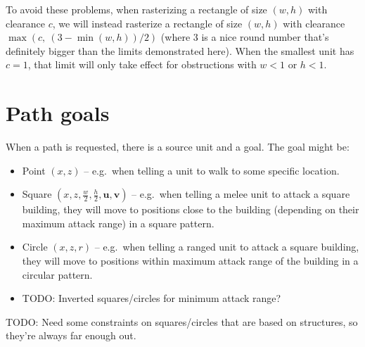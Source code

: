 \documentclass[a4paper,10pt]{article}
\begin{document}

To avoid these problems,
when rasterizing a rectangle of size $(w,h)$ with clearance $c$,
we will instead rasterize a rectangle of size $(w,h)$ with clearance $\max(c,\ (3-\min(w,h))/2)$
(where 3 is a nice round number that's definitely bigger than the limits demonstrated here).
When the smallest unit has $c=1$,
that limit will only take effect for obstructions with $w < 1$ or $h < 1$.

\section{Path goals}

When a path is requested, there is a source unit and a goal.
The goal might be:
\begin{itemize}
 \item Point $(x, z)$ --
 e.g.\ when telling a unit to walk to some specific location.
 \item Square $(x, z, \frac{w}{2}, \frac{h}{2}, \mathbf{u}, \mathbf{v})$ --
 e.g.\ when telling
 a melee unit to attack a square building, they will move to positions close to the building
 (depending on their maximum attack range) in a square pattern.
 \item Circle $(x, z, r)$ --
 e.g.\ when telling
 a ranged unit to attack a square building, they will move to positions within
 maximum attack range of the building in a circular pattern.
 \item TODO: Inverted squares/circles for minimum attack range?
\end{itemize}

TODO: Need some constraints on squares/circles that are based on structures,
so they're always far enough out.
\end{document}
